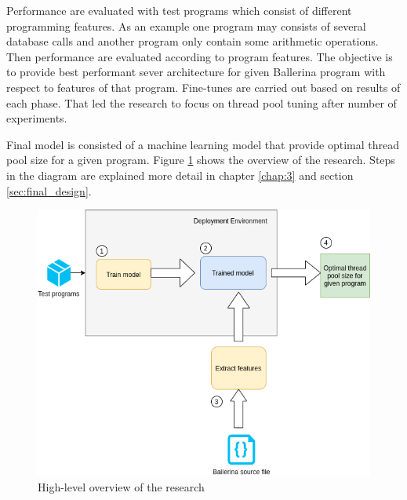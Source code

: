 	Performance are evaluated with test programs which consist of different programming features. As an example one program may consists of several database calls and another program only contain some arithmetic operations. Then performance are evaluated according to program features. The objective is to provide best performant sever architecture for given Ballerina program with respect to features of that program. Fine-tunes are carried out based on results of each phase. That led the research to focus on thread pool tuning after number of experiments. 
	
	Final model is consisted of a machine learning model that provide optimal thread pool size for a given program. Figure  \ref{hl_architecture} shows the overview of the research. Steps in the diagram are explained more detail in chapter \ref{chap:3} and section \ref{sec:final_design}.
	

	
	\begin{figure}[htbp]
		\begin{center}
			\includegraphics[scale=0.5]{figures/hl_architecture.png}
		\end{center}
		\caption{High-level overview of the research}
		\label{hl_architecture}
	\end{figure}
	

